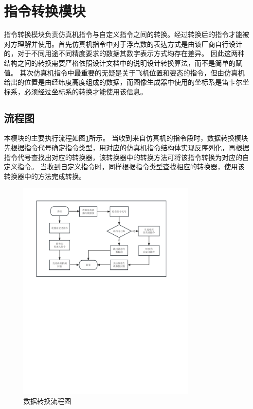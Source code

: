 \section{指令转换模块}
指令转换模块负责仿真机指令与自定义指令之间的转换。经过转换后的指令才能被对方理解并使用。首先仿真机指令中对于浮点数的表达方式是由该厂商自行设计的，对于不同用途不同精度要求的数据其数字表示方式均存在差异。
因此这两种结构之间的转换需要严格依照设计文档中的说明设计转换算法，而不是简单的赋值。
其次仿真机指令中最重要的无疑是关于飞机位置和姿态的指令，但由仿真机给出的位置是由经纬度高度组成的数据，而图像生成器中使用的坐标系是笛卡尔坐标系，必须经过坐标系的转换才能使用该信息。
\subsection{流程图}
\par
本模块的主要执行流程如图\ref{module21}所示。
当收到来自仿真机的指令段时，数据转换模块先根据指令代号确定指令类型，用对应的仿真机指令结构体实现反序列化，再根据指令代号查找出对应的转换器，该转换器中的转换方法可将该指令转换为对应的自定义指令。
当收到自定义指令时，同样根据指令类型查找相应的转换器，使用该转换器中的方法完成转换。
\begin{figure}[h!]
    \begin{center}
        \includegraphics[width=0.8\textwidth]{pictures/flowchart2.pdf}
        \caption{数据转换流程图}
        \label{module21}
    \end{center}
\end{figure}
